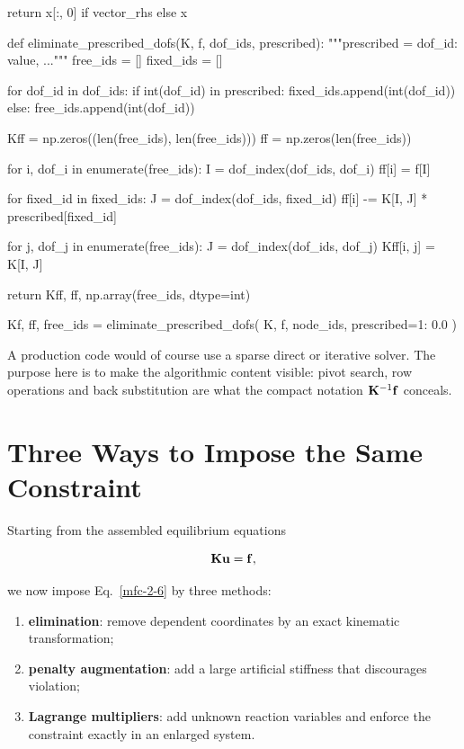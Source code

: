 \begin{python}
    return x[:, 0] if vector_rhs else x


def eliminate_prescribed_dofs(K, f, dof_ids, prescribed):
    """prescribed = {dof_id: value, ...}"""
    free_ids = []
    fixed_ids = []

    for dof_id in dof_ids:
        if int(dof_id) in prescribed:
            fixed_ids.append(int(dof_id))
        else:
            free_ids.append(int(dof_id))

    Kff = np.zeros((len(free_ids), len(free_ids)))
    ff = np.zeros(len(free_ids))

    for i, dof_i in enumerate(free_ids):
        I = dof_index(dof_ids, dof_i)
        ff[i] = f[I]

        for fixed_id in fixed_ids:
            J = dof_index(dof_ids, fixed_id)
            ff[i] -= K[I, J] * prescribed[fixed_id]

        for j, dof_j in enumerate(free_ids):
            J = dof_index(dof_ids, dof_j)
            Kff[i, j] = K[I, J]

    return Kff, ff, np.array(free_ids, dtype=int)


Kf, ff, free_ids = eliminate_prescribed_dofs(
    K, f, node_ids, prescribed={1: 0.0}
)
\end{python}

A production code would of course use a sparse direct or iterative solver. The
purpose here is to make the algorithmic content visible: pivot search, row
operations and back substitution are what the compact notation
$\mathbf{K}^{-1}\mathbf{f}$ conceals.

\section{Three Ways to Impose the Same Constraint}

Starting from the assembled equilibrium equations

\begin{equation}\label{mfc-unconstrained-system}
    \mathbf{K}\mathbf{u}=\mathbf{f},
\end{equation}

we now impose Eq.~\eqref{mfc-2-6} by three methods:

\begin{enumerate}
    \item \textbf{elimination}: remove dependent coordinates by an exact
    kinematic transformation;
    \item \textbf{penalty augmentation}: add a large artificial stiffness that
    discourages violation;
    \item \textbf{Lagrange multipliers}: add unknown reaction variables and
    enforce the constraint exactly in an enlarged system.
\end{enumerate}

